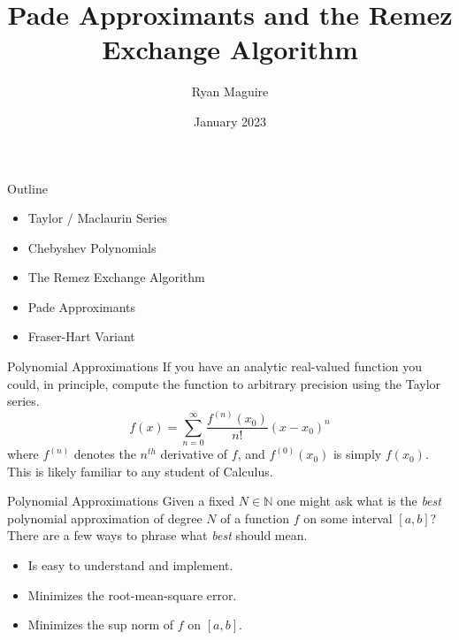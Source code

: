 \documentclass{beamer}
\title{Pade Approximants and the Remez Exchange Algorithm}
\author{Ryan Maguire}
\date{January 2023}
\begin{document}
    \maketitle
    \begin{frame}{Outline}
        \begin{itemize}
            \item Taylor / Maclaurin Series
            \item Chebyshev Polynomials
            \item The Remez Exchange Algorithm
            \item Pade Approximants
            \item Fraser-Hart Variant
        \end{itemize}
    \end{frame}
    \begin{frame}{Polynomial Approximations}
        If you have an analytic real-valued function you could, in principle,
        compute the function to arbitrary precision using the Taylor series.
        \begin{equation}
            f(x)=\sum_{n=0}^{\infty}\frac{f^{(n)}(x_{0})}{n!}(x-x_{0})^{n}
        \end{equation}
        where $f^{(n)}$ denotes the $n^{th}$ derivative of $f$, and
        $f^{(0)}(x_{0})$ is simply $f(x_{0})$. This is likely familiar to any
        student of Calculus.
    \end{frame}
    \begin{frame}{Polynomial Approximations}
        Given a fixed $N\in\mathbb{N}$ one might ask what is the
        \textit{best} polynomial approximation of degree $N$ of a function $f$
        on some interval $[a,b]$? There are a few ways to phrase what
        \textit{best} should mean.
        \begin{itemize}
            \item Is easy to understand and implement.
            \item Minimizes the root-mean-square error.
            \item Minimizes the sup norm of $f$ on $[a,b]$.
        \end{itemize}
    \end{frame}
\end{document}
